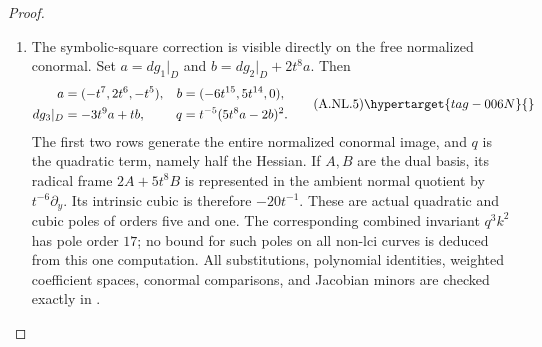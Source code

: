 \begin{proof}
\begin{enumerate}[label={$\langle1\rangle$\arabic*.},leftmargin=*]
\item The symbolic-square correction is visible directly on the free
normalized conormal. Set $a=dg_1|_D$ and
$b=dg_2|_D+2t^8a$. Then
\[
 \begin{aligned}
 a&=(-t^7,2t^6,-t^5),& b&=(-6t^{15},5t^{14},0),\\
 dg_3|_D&=-3t^9a+tb,&
 q&=t^{-5}(5t^8a-2b)^2.
 \end{aligned}                                                   \tag{A.NL.5}\hypertarget{tag-006N}{}\label{cdp:eq:A.NL.5}
\]
The first two rows generate the entire normalized conormal image,
and $q$ is the quadratic term, namely half the Hessian.
If $A,B$ are the dual basis, its radical frame $2A+5t^8B$
is represented in the ambient normal quotient by $t^{-6}\partial_y$.
Its intrinsic cubic is therefore $-20t^{-1}$. These are actual
quadratic and cubic poles of orders five and one. The corresponding
combined invariant $q^3k^2$ has pole order $17$; no bound for such
poles on all non-lci curves is deduced from this one computation.
All substitutions, polynomial identities, weighted coefficient
spaces, conormal comparisons, and Jacobian minors are checked
exactly in .

\end{enumerate}
\end{proof}